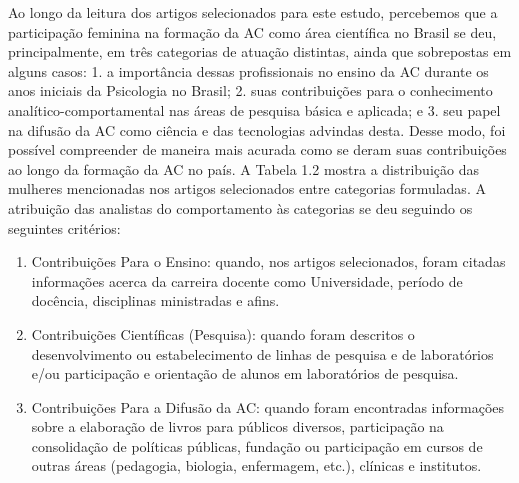 Ao longo da leitura dos artigos selecionados para este estudo, percebemos que a participação feminina na formação da AC como área científica no Brasil se deu, principalmente, em três categorias de atuação distintas, ainda que sobrepostas em alguns casos: 1. a importância dessas profissionais no ensino da AC durante os anos iniciais da Psicologia no Brasil; 2. suas contribuições para o conhecimento analítico-comportamental nas áreas de pesquisa básica e aplicada; e 3. seu papel na difusão da AC como ciência e das tecnologias advindas desta. Desse modo, foi possível compreender de maneira mais acurada como se deram suas contribuições ao longo da formação da AC no país. A Tabela 1.2 mostra a distribuição das mulheres mencionadas nos artigos selecionados entre categorias formuladas. A atribuição das analistas do comportamento às categorias se deu seguindo os seguintes critérios:

\begin{enumerate}[1. ]
\item Contribuições Para o Ensino: quando, nos artigos selecionados, foram citadas informações acerca da carreira docente como Universidade, período de docência, disciplinas ministradas e afins.

\item Contribuições Científicas (Pesquisa): quando foram descritos o desenvolvimento ou estabelecimento de linhas de pesquisa e de laboratórios e/ou participação e orientação de alunos em laboratórios de pesquisa.

\item Contribuições Para a Difusão da AC: quando foram encontradas informações sobre a elaboração de livros para públicos diversos, participação na consolidação de políticas públicas, fundação ou participação em cursos de outras áreas (pedagogia, biologia, enfermagem, etc.), clínicas e institutos.
\end{enumerate}

